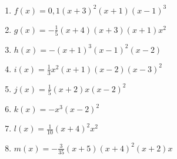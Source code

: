 \newpage
\begin{Exercise}[title={Skizziere das Schaubild}, label=ganzProduktA1]\\
	\begin{minipage}{\textwidth}
		\begin{minipage}{0.49\textwidth}
			\begin{enumerate}[label=\alph*)]
				\item \(f(x)=0,1\left(x+3\right)^2\left(x+1\right)\left(x-1\right)^3\)
				\item \(g(x)=-\frac{1}{5}\left(x+4\right) \left(x+3\right) \left(x+1\right) x^2 \)
				\item \(h(x)=-\left(x+1\right)^3 \left(x-1\right)^2 \left(x-2\right)\)
				\item \(i(x)=\frac{1}{3}x^2\left(x+1\right) \left( x-2\right) \left( x-3\right) ^2\)
			\end{enumerate}
		\end{minipage}
		\begin{minipage}{0.49\textwidth}
			\begin{enumerate}[label=\alph*)]
				\setcounter{enumi}{4}
				\item \(j(x)=\frac{1}{5}\left( x+2\right) x\left( x-2\right) ^2\)
				\item \(k(x)=-x^3\left( x-2\right) ^2\)
				\item \(l(x)=\frac{1}{10}\left( x+4\right) ^2 x^2\)
				\item \(m(x)=-\frac{3}{35}\left( x+5\right) \left( x+4\right) ^2\left( x+2\right) x\)
			\end{enumerate}
		\end{minipage}
	\end{minipage}
\end{Exercise}
